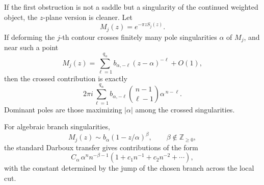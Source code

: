 \documentclass[11pt]{article}
\newcommand{\1}{\mathbf 1}
\begin{document}
If the first obstruction is not a saddle but a singularity of the continued weighted
object, the \(z\)-plane version is cleaner. Let
\[
  M_j(z)=e^{-\pi zS_j(z)}.
\]
If deforming the \(j\)-th contour crosses finitely many pole singularities \(\alpha\) of
\(M_j\), and near such a point
\[
  M_j(z)=\sum_{\ell=1}^{q_\alpha}
  b_{\alpha,-\ell}(z-\alpha)^{-\ell}+O(1),
\]
then the crossed contribution is exactly
\begin{equation}\label{eq:pole-exact}
  2\pi i
  \sum_{\ell=1}^{q_\alpha}
  b_{\alpha,-\ell}
  \binom{n-1}{\ell-1}
  \alpha^{\,n-\ell}.
\end{equation}
Dominant poles are those maximizing \(|\alpha|\) among the crossed singularities.

For algebraic branch singularities,
\[
  M_j(z)\sim b_\alpha(1-z/\alpha)^\beta,
  \qquad \beta\notin\mathbb Z_{\ge0},
\]
the standard Darboux transfer gives contributions of the form
\begin{equation}\label{eq:branch-form}
  C_\alpha\,\alpha^n n^{-\beta-1}
  \left(1+c_1n^{-1}+c_2n^{-2}+\cdots\right),
\end{equation}
with the constant determined by the jump of the chosen branch across the local cut.
\end{document}
